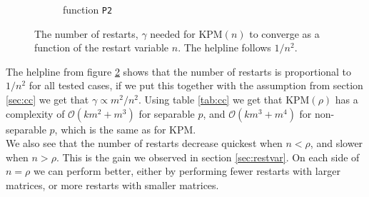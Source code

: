 \begin{figure}[H]
\begin{subfigure}[b]{0.45\textwidth}
                \caption{function \texttt{P2}}
                \label{fig:ant2}
        \end{subfigure}
        \caption{The number of restarts, $\gamma$ needed for KPM$(n)$ to converge as a function of the restart variable $n$. The helpline follows $1/n^2$.}\label{fig:ant}
\end{figure}

The helpline from figure \ref{fig:ant} shows that the number of restarts is proportional to $1/n^2$ for all tested cases, if we put this together with the assumption from section \ref{sec:cc} we get that $\gamma \propto  m^2/n^2$. Using table \ref{tab:cc} we get that KPM$(\rho)$ has a complexity of $\mathcal{O}(km^2 + m^3)$ for separable $p$, and $\mathcal{O}(km^3 + m^4)$ for non-separable $p$, which is the same as for KPM.\\

We also see that the number of restarts decrease quickest when $n < \rho $, and slower when $n > \rho$. This is the gain we observed in section \ref{sec:restvar}. On each side of $n = \rho$ we can perform better, either by performing fewer restarts with larger matrices, or more restarts with smaller matrices. \\
